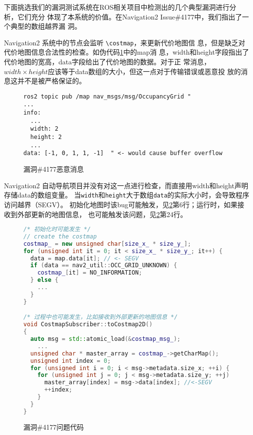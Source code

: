 
下面挑选我们的漏洞测试系统在ROS相关项目中检测出的几个典型漏洞进行分析，它们充分
体现了本系统的价值。在Navigation2 Issue\#4177中，我们指出了一个典型的数组越界漏
洞。

Navigation2 系统中的节点会监听 \texttt{\textbackslash costmap}，来更新代价地图信
息，但是缺乏对代价地图信息合法性的检查。如伪代码\ref{lst:bug:msg}中的map消
息，width和height字段指出了代价地图的宽高，data字段给出了代价地图的数据。对于正
常消息，$width\times height$应该等于data数组的大小，但这一点对于传输错误或恶意投
放的消息这并不是被严格保证的。

\begin{figure}[H]
\begin{lstlisting}[]
ros2 topic pub /map nav_msgs/msg/OccupancyGrid "
...
info:
  ...
  width: 2
  height: 2
  ...
data: [-1, 0, 1, 1, -1]  " <- would cause buffer overflow
\end{lstlisting}
  \caption{漏洞\#4177恶意消息}
\label{lst:bug:msg}
\end{figure}

Navigation2 自动导航项目并没有对这一点进行检查，而直接用width和height声明存储data的数组变量。
当\texttt{width}和\texttt{height}大于数组\texttt{data}的实际大小时，会导致程序访问越界（SEGV）。
初始化地图时该bug可能触发，见\ref{lst:bug:segv}第6行；运行时，如果接收到外部更新的地图信息，
也可能触发该问题，见\ref{lst:bug:segv}第24行。

\begin{figure}[H]
\begin{lstlisting}[language=C++]
/* 初始化时可能发生 */
// create the costmap
costmap_ = new unsigned char[size_x_ * size_y_];
for (unsigned int it = 0; it < size_x_ * size_y_; it++) {
  data = map.data[it]; // <- SEGV
  if (data == nav2_util::OCC_GRID_UNKNOWN) {
    costmap_[it] = NO_INFORMATION;
  } else {
    ...
  }
}

/* 过程中也可能发生，比如接收到外部更新的地图信息 */
void CostmapSubscriber::toCostmap2D()
{
  auto msg = std::atomic_load(&costmap_msg_);
	...
  unsigned char * master_array = costmap_->getCharMap();
  unsigned int index = 0;
  for (unsigned int i = 0; i < msg->metadata.size_x; ++i) {
    for (unsigned int j = 0; j < msg->metadata.size_y; ++j) {
      master_array[index] = msg->data[index]; //<-SEGV
      ++index;
    }
  }
}
\end{lstlisting}
  \caption{漏洞\#4177问题代码}
\label{lst:bug:segv}
\end{figure}

